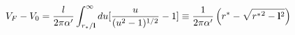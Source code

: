 \begin{equation}
V_F-V_0= \frac{l}{2\pi\alpha'}\int_{r_*/{\bf l}}^\infty du [ 
\frac{u}{(u^2-1)^{1/2}}-1]\equiv \frac{1}{2\pi\alpha'}\left({r^*}-\sqrt{ 
{r^*}^2-{\bf l}^2}\right)
\end{equation}

